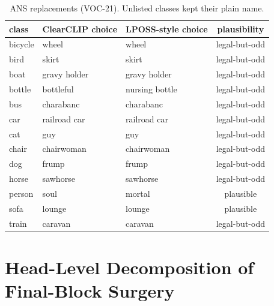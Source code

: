 \documentclass[11pt]{article}
\begin{document}
\begin{table}[h]
\centering\small
\caption{ANS replacements (VOC-21). Unlisted classes kept their plain name.}
\label{tab:ansvocab}
\begin{tabular}{lllc}
\toprule
class & ClearCLIP choice & LPOSS-style choice & plausibility \\
\midrule
bicycle & wheel & wheel & legal-but-odd \\
bird & skirt & skirt & legal-but-odd \\
boat & gravy holder & gravy holder & legal-but-odd \\
bottle & bottleful & nursing bottle & legal-but-odd \\
bus & charabanc & charabanc & legal-but-odd \\
car & railroad car & railroad car & legal-but-odd \\
cat & guy & guy & legal-but-odd \\
chair & chairwoman & chairwoman & legal-but-odd \\
dog & frump & frump & legal-but-odd \\
horse & sawhorse & sawhorse & legal-but-odd \\
person & soul & mortal & plausible \\
sofa & lounge & lounge & plausible \\
train & caravan & caravan & legal-but-odd \\
\bottomrule
\end{tabular}
\end{table}

\section{Head-Level Decomposition of Final-Block Surgery}
\label{app:headlens}
\end{document}
